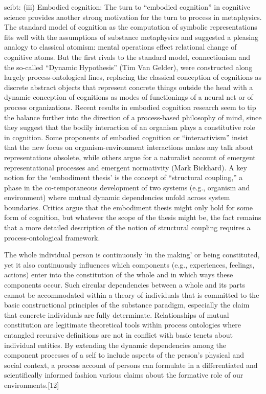 seibt:
(iii) Embodied cognition: The turn to “embodied cognition” in cognitive science provides another strong motivation for the turn to process in metaphysics. The standard model of cognition as the computation of symbolic representations fits well with the assumptions of substance metaphysics and suggested a pleasing analogy to classical atomism: mental operations effect relational change of cognitive atoms. But the first rivals to the standard model, connectionism and the so-called “Dynamic Hypothesis” (Tim Van Gelder), were constructed along largely process-ontological lines, replacing the classical conception of cognitions as discrete abstract objects that represent concrete things outside the head with a dynamic conception of cognitions as modes of functionings of a neural net or of process organizations. Recent results in embodied cognition research seem to tip the balance further into the direction of a process-based philosophy of mind, since they suggest that the bodily interaction of an organism plays a constitutive role in cognition. Some proponents of embodied cognition or “interactivism” insist that the new focus on organism-environment interactions makes any talk about representations obsolete, while others argue for a naturalist account of emergent representational processes and emergent normativity (Mark Bickhard). A key notion for the ‘embodiment thesis’ is the concept of “structural coupling,” a phase in the co-temporaneous development of two systems (e.g., organism and environment) where mutual dynamic dependencies unfold across system boundaries. Critics argue that the embodiment thesis might only hold for some form of cognition, but whatever the scope of the thesis might be, the fact remains that a more detailed description of the notion of structural coupling requires a process-ontological framework.

The whole individual person is continuously ‘in the making’ or being constituted, yet it also continuously influences which components (e.g., experiences, feelings, actions) enter into the constitution of the whole and in which ways these components occur. Such circular dependencies between a whole and its parts cannot be accommodated within a theory of individuals that is committed to the basic constructional principles of the substance paradigm, especially the claim that concrete individuals are fully determinate. Relationships of mutual constitution are legitimate theoretical tools within process ontologies where entangled recursive definitions are not in conflict with basic tenets about individual entities. By extending the dynamic dependencies among the component processes of a self to include aspects of the person's physical and social context, a process account of persons can formulate in a differentiated and scientifically informed fashion various claims about the formative role of our environments.[12]
